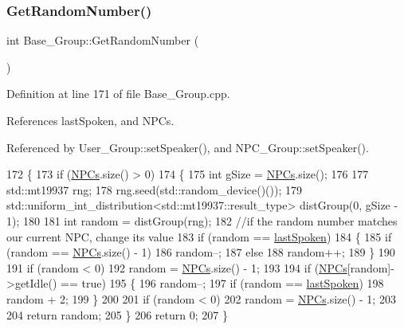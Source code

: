 \subsubsection{\texorpdfstring{Get\+Random\+Number()}{GetRandomNumber()}}
{\footnotesize\ttfamily int Base\+\_\+\+Group\+::\+Get\+Random\+Number (\begin{DoxyParamCaption}{ }\end{DoxyParamCaption})}



Definition at line 171 of file Base\+\_\+\+Group.\+cpp.



References last\+Spoken, and N\+P\+Cs.



Referenced by User\+\_\+\+Group\+::set\+Speaker(), and N\+P\+C\+\_\+\+Group\+::set\+Speaker().


\begin{DoxyCode}
172 \{
173     \textcolor{keywordflow}{if} (\hyperlink{class_base___group_a4757f3c06c73eea029f71b871c1d863e}{NPCs}.size() > 0)
174     \{
175         \textcolor{keywordtype}{int} gSize = \hyperlink{class_base___group_a4757f3c06c73eea029f71b871c1d863e}{NPCs}.size();
176 
177         std::mt19937 rng;
178         rng.seed(std::random\_device()());
179         std::uniform\_int\_distribution<std::mt19937::result\_type> distGroup(0, gSize - 1);
180 
181         \textcolor{keywordtype}{int} random = distGroup(rng);
182         \textcolor{comment}{//if the random number matches our current NPC, change its value}
183         \textcolor{keywordflow}{if} (random == \hyperlink{class_base___group_aa031e7ea2c490eae2e8101fb4093da00}{lastSpoken})
184         \{
185             \textcolor{keywordflow}{if} (random == \hyperlink{class_base___group_a4757f3c06c73eea029f71b871c1d863e}{NPCs}.size() - 1)
186                 random--;
187             \textcolor{keywordflow}{else}
188                 random++;
189         \}
190 
191         \textcolor{keywordflow}{if} (random < 0)
192             random = \hyperlink{class_base___group_a4757f3c06c73eea029f71b871c1d863e}{NPCs}.size() - 1;
193 
194         \textcolor{keywordflow}{if} (\hyperlink{class_base___group_a4757f3c06c73eea029f71b871c1d863e}{NPCs}[random]->getIdle() == \textcolor{keyword}{true})
195         \{
196             random--;
197             \textcolor{keywordflow}{if} (random == \hyperlink{class_base___group_aa031e7ea2c490eae2e8101fb4093da00}{lastSpoken})
198                 random + 2;
199         \}
200 
201         \textcolor{keywordflow}{if} (random < 0)
202             random = \hyperlink{class_base___group_a4757f3c06c73eea029f71b871c1d863e}{NPCs}.size() - 1;
203 
204         \textcolor{keywordflow}{return} random;
205     \}
206     \textcolor{keywordflow}{return} 0;
207 \}
\end{DoxyCode}
\mbox{\label{class_base___group_a48dadfbc8cdefca9bdd2c42b99115ad8}} 
